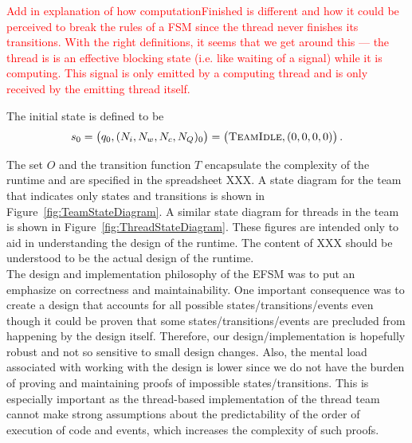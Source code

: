 \documentclass{article}
\newcommand{\TeamIdle}          {\textsc{TeamIdle}}
\begin{document}
\textcolor{red}{Add in explanation of how computationFinished is different and
how it could be perceived to break the rules of a FSM since the thread never
finishes its transitions.  With the right definitions, it seems that we get
around this --- the thread is is an effective blocking state (i.e. like waiting
of a signal) while it is computing.  This signal is only emitted by a computing
thread and is only received by the emitting thread itself.}

The initial state is defined to be
\[
s_0 = \left(q_0, (N_i, N_w, N_c, N_Q)_0\right) = \left(\TeamIdle, (0, 0, 0, 0)\right).
\]

The set $O$ and the transition function $T$ encapsulate the complexity of the
runtime and are specified in the spreadsheet XXX.  A state diagram for the team
that indicates only states and transitions is shown in
Figure~\ref{fig:TeamStateDiagram}.  A similar state diagram for threads in the
team is shown in Figure~\ref{fig:ThreadStateDiagram}.  These figures are
intended only to aid in understanding the design of the runtime.  The content of
XXX should be understood to be the actual design of the runtime.\\

The design and implementation philosophy of the EFSM was to put an emphasize on
correctness and maintainability.  One important consequence was to create a
design that accounts for all possible states/transitions/events even though it
could be proven that some states/transitions/events are precluded from happening
by the design itself.  Therefore, our design/implementation is hopefully robust
and not so sensitive to small design changes.  Also, the mental load associated
with working with the design is lower since we do not have the burden of proving
and maintaining proofs of impossible states/transitions.  This is especially
important as the thread-based implementation of the thread team cannot make
strong assumptions about the predictability of the order of execution of code
and events, which increases the complexity of such proofs.
\end{document}
